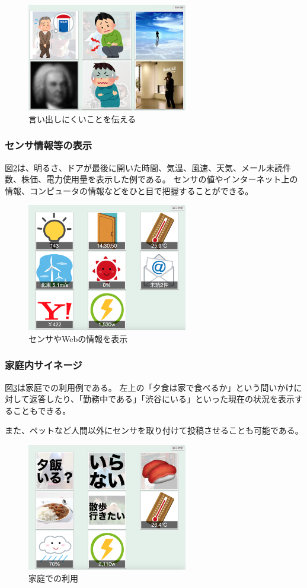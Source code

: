 \begin{figure}[h]
\centering
\includegraphics[width=7cm]{images/rescue.eps}
\caption{言い出しにくいことを伝える}
\label{rescue}
\end{figure}

\subsubsection{センサ情報等の表示}

図\ref{sensors}は、明るさ、ドアが最後に開いた時間、気温、風速、天気、メール未読件数、株価、電力使用量を表示した例である。
センサの値やインターネット上の情報、コンピュータの情報などをひと目で把握することができる。

\begin{figure}[h]
\centering
\includegraphics[width=7cm]{images/sensors.eps}
\caption{センサやWebの情報を表示}
\label{sensors}
\end{figure}

\subsubsection{家庭内サイネージ}

図\ref{home}は家庭での利用例である。
左上の「夕食は家で食べるか」という問いかけに対して返答したり、「勤務中である」「渋谷にいる」といった現在の状況を表示することもできる。

また、ペットなど人間以外にセンサを取り付けて投稿させることも可能である。

\begin{figure}[h]
\centering
\includegraphics[width=7cm]{images/home.eps}
\caption{家庭での利用}
\label{home}
\end{figure}
